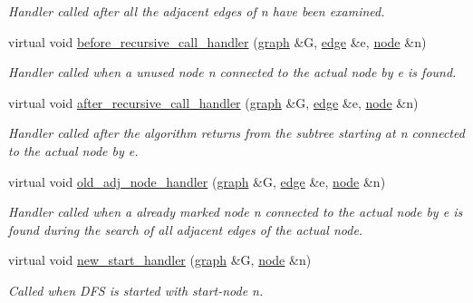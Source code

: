 \begin{DoxyCompactItemize}
\begin{DoxyCompactList}\small\item\em Handler called after all the adjacent edges of {\itshape n} have been examined. \end{DoxyCompactList}\item 
virtual void \mbox{\hyperlink{classdfs_ae3f095c9fe6106e82c24543da4844ea3}{before\+\_\+recursive\+\_\+call\+\_\+handler}} (\mbox{\hyperlink{classgraph}{graph}} \&G, \mbox{\hyperlink{classedge}{edge}} \&e, \mbox{\hyperlink{classnode}{node}} \&n)
\begin{DoxyCompactList}\small\item\em Handler called when a unused node {\itshape n} connected to the actual node by {\itshape e} is found. \end{DoxyCompactList}\item 
virtual void \mbox{\hyperlink{classdfs_a25ae75fe08f1d8c0fedcf9dcae09d092}{after\+\_\+recursive\+\_\+call\+\_\+handler}} (\mbox{\hyperlink{classgraph}{graph}} \&G, \mbox{\hyperlink{classedge}{edge}} \&e, \mbox{\hyperlink{classnode}{node}} \&n)
\begin{DoxyCompactList}\small\item\em Handler called after the algorithm returns from the subtree starting at {\itshape n} connected to the actual node by {\itshape e}. \end{DoxyCompactList}\item 
virtual void \mbox{\hyperlink{classdfs_adf1c667188e632761c63f529537c544c}{old\+\_\+adj\+\_\+node\+\_\+handler}} (\mbox{\hyperlink{classgraph}{graph}} \&G, \mbox{\hyperlink{classedge}{edge}} \&e, \mbox{\hyperlink{classnode}{node}} \&n)
\begin{DoxyCompactList}\small\item\em Handler called when a already marked node {\itshape n} connected to the actual node by {\itshape e} is found during the search of all adjacent edges of the actual node. \end{DoxyCompactList}\item 
virtual void \mbox{\hyperlink{classdfs_a3b5fbea7a7baed9946cfb4444a7f20ea}{new\+\_\+start\+\_\+handler}} (\mbox{\hyperlink{classgraph}{graph}} \&G, \mbox{\hyperlink{classnode}{node}} \&n)
\begin{DoxyCompactList}\small\item\em Called when D\+FS is started with start-\/node {\itshape n}. \end{DoxyCompactList}\end{DoxyCompactItemize}
